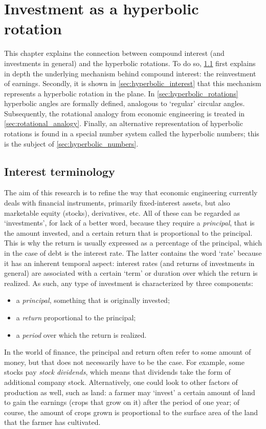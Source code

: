 \chapter{Investment as a hyperbolic rotation}
\label{chap:finance_rotation}
This chapter explains the connection between compound interest (and investments in general) and the hyperbolic rotations. To do so, \cref{sec:terminology} first explains in depth the underlying mechanism behind compound interest: the reinvestment of earnings. Secondly, it is shown in \cref{sec:hyperbolic_interest} that this mechanism represents a hyperbolic rotation in the plane. In \cref{sec:hyperbolic_rotations} hyperbolic angles are formally defined, analogous to `regular' circular angles. Subsequently, the rotational analogy from economic engineering is treated in \cref{sec:rotational_analogy}. Finally, an alternative representation of hyperbolic rotations is found in a special number system called the hyperbolic numbers; this is the subject of \cref{sec:hyperbolic_numbers}.

\section{Interest terminology}
\label{sec:terminology}
The aim of this research is to refine the way that economic engineering currently deals with financial instruments, primarily fixed-interest assets, but also marketable equity (stocks), derivatives, etc. All of these can be regarded as `investments', for lack of a better word, because they require a \emph{principal}, that is the amount invested, and a certain return that is proportional to the principal. This is why the return is usually expressed as a percentage of the principal, which in the case of debt is the interest rate. The latter contains the word `rate' because it has an inherent temporal aspect: interest rates (and returns of investments in general) are associated with a certain `term' or duration over which the return is realized. As such, any type of investment is characterized by three components:
\begin{itemize}[itemsep=0.3ex,topsep=0.3ex]
    \item a \emph{principal}, something that is originally invested;
    \item a \emph{return} proportional to the principal;
    \item a \emph{period} over which the return is realized.
\end{itemize}
In the world of finance, the principal and return often refer to some amount of money, but that does not necessarily have to be the case. For example, some stocks pay \emph{stock dividends}, which means that dividends take the form of additional company stock. Alternatively, one could look to other factors of production as well, such as land: a farmer may `invest' a certain amount of land to gain the earnings (crops that grow on it) after the period of one year; of course, the amount of crops grown is proportional to the surface area of the land that the farmer has cultivated.


